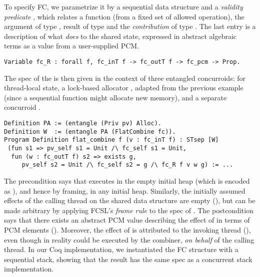 To specify FC, we parametrize it by a sequential data structure and a
\emph{validity predicate} , which relates a function
 (from a fixed set of allowed operation), the argument of type
, result of type  and the
\emph{contribution} of type . The last entry is a
description of what  \emph{does} to the shared state,
expressed in abstract algebraic terms as a value from a user-supplied
PCM.
%
\begin{lstlisting}
Variable fc_R : forall f, fc_inT f -> fc_outT f -> fc_pcm -> Prop.
\end{lstlisting}
%
The spec of the  is then given in the context of
three entangled concurroids:  for thread-local state, a
lock-based allocator , adapted from the previous example
(since a sequential function  might allocate new memory), and
a separate concurroid .
%
\begin{lstlisting}
Definition PA := (entangle (Priv pv) Alloc).
Definition W  := (entangle PA (FlatCombine fc)).  
Program Definition flat_combine f (v : fc_inT f) : STsep [W] 
 (fun s1 => pv_self s1 = Unit /\ fc_self s1 = Unit,
  fun (w : fc_outT f) s2 => exists g,
     pv_self s2 = Unit /\ fc_self s2 = g /\ fc_R f v w g) := ...
\end{lstlisting}
% 
The precondition says that  executes in the empty
initial heap (which is encoded as ), and hence
by framing, in any initial heap. Similarly, the initially assumed
effects of the calling thread on the shared data structure are empty
(), but can be made arbitrary by applying
FCSL's \emph{frame rule} to the spec of .
%
The postcondition says that there exists an abstract PCM value
 describing the effect of  in terms of PCM elements
(). Moreover, the effect of  is attributed
to the invoking thread (), even though in reality
 could be executed by the combiner, \emph{on behalf} of the
calling thread.
%
In our Coq implementation, we instantiated the FC structure with a sequential
stack, showing that the result has the same spec as a concurrent stack
implementation.
